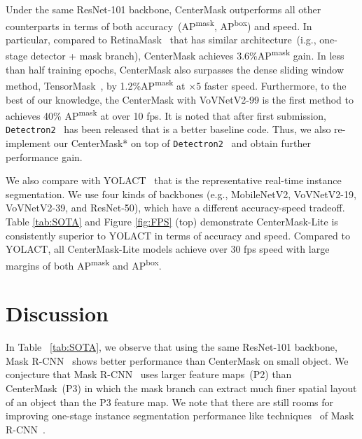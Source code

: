 \documentclass[10pt,twocolumn,letterpaper]{article}
\begin{document}
Under the same ResNet-101 backbone, CenterMask outperforms all other counterparts in terms of both accuracy~(AP\textsuperscript{mask}, AP\textsuperscript{box}) and speed.
In particular, compared to RetinaMask~\cite{fu2019retinamask} that has similar architecture~(i.g., one-stage detector + mask branch), CenterMask achieves 3.6\%AP\textsuperscript{mask} gain.
In less than half training epochs, CenterMask also surpasses the dense sliding window method, TensorMask~\cite{Chen_2019_ICCV}, by 1.2\%AP\textsuperscript{mask} at $\times5$ faster speed.
Furthermore, to the best of our knowledge, the CenterMask with VoVNetV2-99 is the first method to achieves 40\% AP\textsuperscript{mask} at over 10 fps.
It is noted that after first submission, \texttt{Detectron2}~\cite{wu2019detectron2} has been released that is a better baseline code.
Thus, we also re-implement our CenterMask* on top of \texttt{Detectron2}~\cite{wu2019detectron2} and obtain further performance gain.


We also compare with YOLACT~\cite{Bolya_2019_ICCV} that is the representative real-time instance segmentation.
We use four kinds of backbones (e.g., MobileNetV2, VoVNetV2-19, VoVNetV2-39, and ResNet-50), which have a different accuracy-speed tradeoff.
Table \ref{tab:SOTA} and Figure \ref{fig:FPS} (top) demonstrate CenterMask-Lite is consistently superior to YOLACT in terms of accuracy and speed.
Compared to YOLACT, all CenterMask-Lite models achieve over 30 fps speed with large margins of both AP\textsuperscript{mask} and AP\textsuperscript{box}.




\section{Discussion}
\noindent
In Table ~\ref{tab:SOTA}, we observe that using the same ResNet-101 backbone, Mask R-CNN~\cite{he2017mask} shows better performance than CenterMask on small object.
We conjecture that Mask R-CNN~\cite{he2017mask} uses larger feature maps~(P2) than CenterMask~(P3) in which the mask branch can extract much finer spatial layout of an object than the P3 feature map.
We note that there are still rooms for improving one-stage instance segmentation performance like techniques~\cite{cai2018cascade,chen2019hybrid} of Mask R-CNN~\cite{he2017mask}. 
\end{document}
